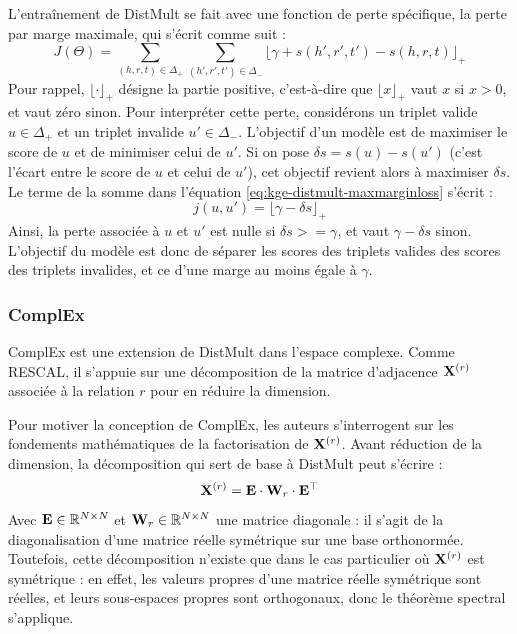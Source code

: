 L'entraînement de DistMult se fait avec une fonction de perte spécifique, la perte par marge maximale, qui s'écrit comme suit :
\begin{equation}
    J(\Theta) = \sum_{(h, r, t) \in \Delta_+} \sum_{(h', r', t') \in \Delta_-} \lfloor \gamma + s(h', r', t') - s(h, r, t) \rfloor_+
    \label{eq:kge-distmult-maxmarginloss}
\end{equation}
Pour rappel, $\lfloor \cdot \rfloor_+$ désigne la partie positive, c'est-à-dire que $\lfloor x \rfloor_+$ vaut $x$ si $x > 0$, et vaut zéro sinon. Pour interpréter cette perte, considérons un triplet valide $u \in \Delta_+$ et un triplet invalide $u' \in \Delta_-$. L'objectif d'un modèle est de maximiser le score de $u$ et de minimiser celui de $u'$. Si on pose $\delta s = s(u) - s(u')$ (c'est l'écart entre le score de $u$ et celui de $u'$), cet objectif revient alors à maximiser $\delta s$. Le terme de la somme dans l'équation \ref{eq:kge-distmult-maxmarginloss} s'écrit :
\begin{equation}
    j(u, u') = \lfloor \gamma - \delta s \rfloor_+
\end{equation}
Ainsi, la perte associée à $u$ et $u'$ est nulle si $\delta s >= \gamma$, et vaut $\gamma - \delta s$ sinon. L'objectif du modèle est donc de séparer les scores des triplets valides des scores des triplets invalides, et ce d'une marge au moins égale à $\gamma$.

\subsubsection{ComplEx}
\label{subsec:complex}

ComplEx est une extension de DistMult dans l'espace complexe. Comme RESCAL, il s'appuie sur une décomposition de la matrice d'adjacence $\bf{X}^{(r)}$ associée à la relation $r$ pour en réduire la dimension.

Pour motiver la conception de ComplEx, les auteurs s'interrogent sur les fondements mathématiques de la factorisation de $\bf{X}^{(r)}$. Avant réduction de la dimension, la décomposition qui sert de base à DistMult peut s'écrire :
\begin{equation}
    \bf{X}^{(r)} = \bf{E} \cdot \bf{W}_r \cdot \bf{E}^\top
    \label{eq:kge-complex-spectral}
\end{equation}
Avec $\bf{E} \in \R^{N \times N}$ et $\bf{W}_r \in \R^{N \times N}$ une matrice diagonale : il s'agit de la diagonalisation d'une matrice réelle symétrique sur une base orthonormée. Toutefois, cette décomposition n'existe que dans le cas particulier où $\bf{X}^{(r)}$ est symétrique : en effet, les valeurs propres d'une matrice réelle symétrique sont réelles, et leurs sous-espaces propres sont orthogonaux, donc le théorème spectral s'applique.

